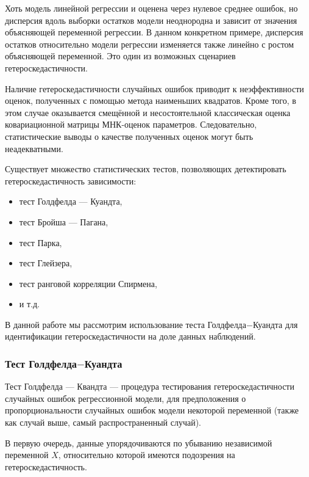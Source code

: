 \documentclass[
]{article}
\providecommand{\tightlist}{%
  \setlength{\itemsep}{0pt}\setlength{\parskip}{0pt}}
\begin{document}
Хоть модель линейной регрессии и оценена через нулевое среднее ошибок,
но дисперсия вдоль выборки остатков модели неоднородна и зависит от
значения объясняющей переменной регрессии. В данном конкретном примере,
дисперсия остатков относительно модели регрессии изменяется также
линейно с ростом объясняющей переменной. Это один из возможных сценариев
гетероскедастичности.

Наличие гетероскедастичности случайных ошибок приводит к неэффективности
оценок, полученных с помощью метода наименьших квадратов. Кроме того, в
этом случае оказывается смещённой и несостоятельной классическая оценка
ковариационной матрицы МНК-оценок параметров. Следовательно,
статистические выводы о качестве полученных оценок могут быть
неадекватными.

Существует множество статистических тестов, позволяющих детектировать
гетероскедастичность зависимости:

\begin{itemize}
\tightlist
\item
  тест Голдфелда --- Куандта,
\item
  тест Бройша --- Пагана,
\item
  тест Парка,
\item
  тест Глейзера,
\item
  тест ранговой корреляции Спирмена,
\item
  и т.д.
\end{itemize}

В данной работе мы рассмотрим использование теста Голдфелда\(-\)Куандта
для идентификации гетероскедастичности на доле данных наблюдений.

\hypertarget{ux442ux435ux441ux442-ux433ux43eux43bux434ux444ux435ux43bux434ux430-ux43aux443ux430ux43dux434ux442ux430}{%
\subsubsection{\texorpdfstring{\textbf{Тест
Голдфелда\(-\)Куандта}}{Тест Голдфелда-Куандта}}\label{ux442ux435ux441ux442-ux433ux43eux43bux434ux444ux435ux43bux434ux430-ux43aux443ux430ux43dux434ux442ux430}}

Тест Голдфелда --- Квандта --- процедура тестирования
гетероскедастичности случайных ошибок регрессионной модели, для
предположения о пропорциональности случайных ошибок модели некоторой
переменной (также как случай выше, самый распространенный случай).

В первую очередь, данные упорядочиваются по убыванию независимой
переменной \(X\), относительно которой имеются подозрения на
гетероскедастичность.
\end{document}
